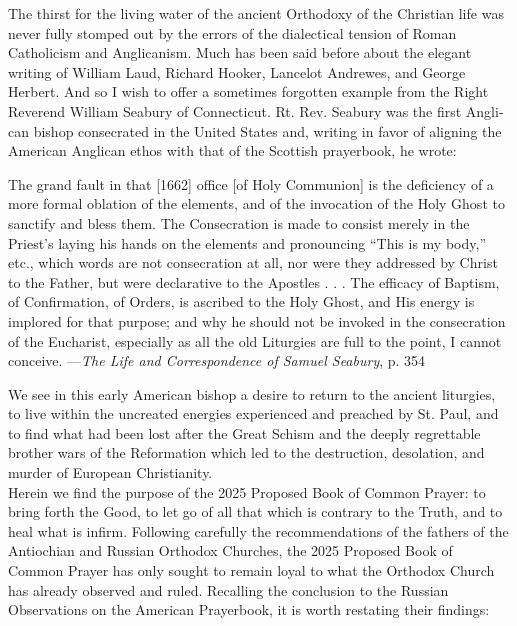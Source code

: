 The thirst for the living water of the ancient Orthodoxy of the Christian life was never fully stomped out by the errors of the dialectical tension of Roman Catholicism and Anglicanism. Much has been said before about the elegant writing of William Laud, Richard Hooker, Lancelot Andrewes, and George Herbert. And so I wish to offer a sometimes forgotten example from the Right Reverend William Seabury of Connecticut. Rt. Rev. Seabury was the first Angli-can bishop consecrated in the United States and, writing in favor of aligning the American Anglican ethos with that of the Scottish prayerbook, he wrote:

\begin{quoting}\noindent
	The grand fault in that [1662] office [of Holy Communion] is the deficiency of a more formal oblation of the elements, and of the invocation of the Holy Ghost to sanctify and bless them. The Consecration is made to consist merely in the Priest's laying his hands on the elements and pronouncing ``This is my body,'' etc., which words are not consecration at all, nor were they addressed by Christ to the Father, but were declarative to the Apostles . . . The efficacy of Baptism, of Confirmation, of Orders, is ascribed to the Holy Ghost, and His energy is implored for that purpose; and why he should not be invoked in the consecration of the Eucharist, especially as all the old Liturgies are full to the point, I cannot conceive. ---\emph{The Life and Correspondence of Samuel Seabury}, p. 354
\end{quoting}

We see in this early American bishop a desire to return to the ancient liturgies, to live within the uncreated energies experienced and preached by St. Paul, and to find what had been lost after the Great Schism and the deeply regrettable brother wars of the Reformation which led to the destruction, desolation, and murder of European Christianity.\\

Herein we find the purpose of the 2025 Proposed Book of Common Prayer: to bring forth the Good, to let go of all that which is contrary to the Truth, and to heal what is infirm. Following carefully the recommendations of the fathers of the Antiochian and Russian Orthodox Churches, the 2025 Proposed Book of Common Prayer has only sought to remain loyal to what the Orthodox Church has already observed and ruled. Recalling the conclusion to the Russian Observations on the American Prayerbook, it is worth restating their findings:

